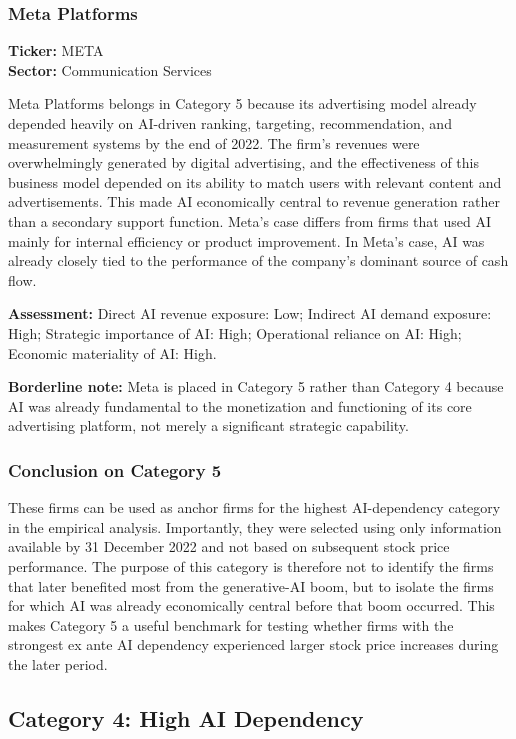 \documentclass{article}
\begin{document}
\subsubsection*{Meta Platforms}
\textbf{Ticker:} META \\
\textbf{Sector:} Communication Services

Meta Platforms belongs in Category 5 because its advertising model already depended heavily on AI-driven ranking, targeting, recommendation, and measurement systems by the end of 2022. The firm’s revenues were overwhelmingly generated by digital advertising, and the effectiveness of this business model depended on its ability to match users with relevant content and advertisements. This made AI economically central to revenue generation rather than a secondary support function. Meta’s case differs from firms that used AI mainly for internal efficiency or product improvement. In Meta’s case, AI was already closely tied to the performance of the company’s dominant source of cash flow.

\textbf{Assessment:} Direct AI revenue exposure: Low; Indirect AI demand exposure: High; Strategic importance of AI: High; Operational reliance on AI: High; Economic materiality of AI: High.

\textbf{Borderline note:} Meta is placed in Category 5 rather than Category 4 because AI was already fundamental to the monetization and functioning of its core advertising platform, not merely a significant strategic capability.

\subsubsection*{Conclusion on Category 5}

These firms can be used as anchor firms for the highest AI-dependency category in the empirical analysis. Importantly, they were selected using only information available by 31 December 2022 and not based on subsequent stock price performance. The purpose of this category is therefore not to identify the firms that later benefited most from the generative-AI boom, but to isolate the firms for which AI was already economically central before that boom occurred. This makes Category 5 a useful benchmark for testing whether firms with the strongest ex ante AI dependency experienced larger stock price increases during the later period.

\subsection{Category 4: High AI Dependency}
\end{document}
